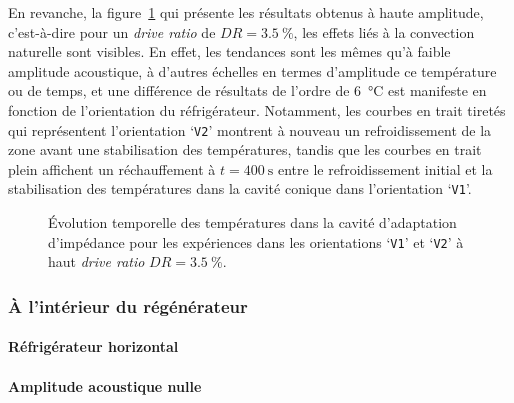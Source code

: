 En revanche, la figure~\ref{fig:Acou_CHXout_V1V2_High} qui présente les résultats obtenus à haute amplitude, c'est-à-dire pour un \textit{drive ratio} de $DR=\qty{3.5}{\percent}$, les effets liés à la convection naturelle sont visibles. En effet, les tendances sont les mêmes qu'à faible amplitude acoustique, à d'autres échelles en termes d'amplitude ce température ou de temps, et une différence de résultats de l'ordre de \qty{6}{\degreeCelsius} est manifeste en fonction de l'orientation du réfrigérateur. Notamment, les courbes en trait tiretés qui représentent l'orientation `\texttt{V2}' montrent à nouveau un refroidissement de la zone avant une stabilisation des températures, tandis que les courbes en trait plein affichent un réchauffement à $t=\qty{400}{\second}$ entre le refroidissement initial et la stabilisation des températures dans la cavité conique dans l'orientation `\texttt{V1}'.

\begin{figure}[!ht]
    \centering
    
    \caption{\'Evolution temporelle des températures dans la cavité d'adaptation d'impédance pour les expériences dans les orientations `\texttt{V1}' et `\texttt{V2}' à haut \textit{drive ratio} $DR=\qty{3.5}{\percent}$.}
    \label{fig:Acou_CHXout_V1V2_High}
\end{figure}



\subsubsection{À l'intérieur du régénérateur}
\paragraph{Réfrigérateur horizontal}
\paragraph*{Amplitude acoustique nulle}

